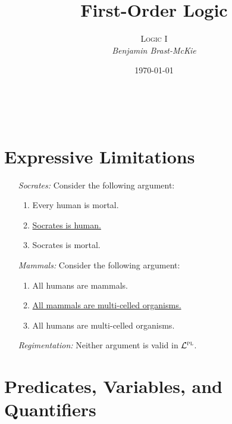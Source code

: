 \documentclass[a4paper, 11pt]{article} %
\title{\textbf{First-Order Logic}} %
\author{\textsc{Logic I}\\ \em Benjamin Brast-McKie} %
\date{\today} %
\makeatletter
\renewcommand{\maketitle}{
\begin{flushright}
{\LARGE\@title}

\vspace{10pt}

{\@author}
\\ \@date
\end{flushright}

\vspace{-20pt}

}
\makeatother
\begin{document}
\maketitle %

\thispagestyle{empty}


\section*{Expressive Limitations}

\begin{enumerate}
  \item[\it Socrates:] Consider the following argument:
  \begin{enumerate}
    \item Every human is mortal.
    \item \underline{Socrates is human.\quad}
    \item Socrates is mortal.
  \end{enumerate}
  \item[\it Mammals:] Consider the following argument:
  \begin{enumerate}
    \item All humans are mammals.
    \item \underline{All mammals are multi-celled organisms.\quad}
    \item All humans are multi-celled organisms.
  \end{enumerate}
  \item[\it Regimentation:] Neither argument is valid in $\mathcal{L}^{\textsc{pl}}$.
\end{enumerate}




\section*{Predicates, Variables, and Quantifiers}
\end{document}
